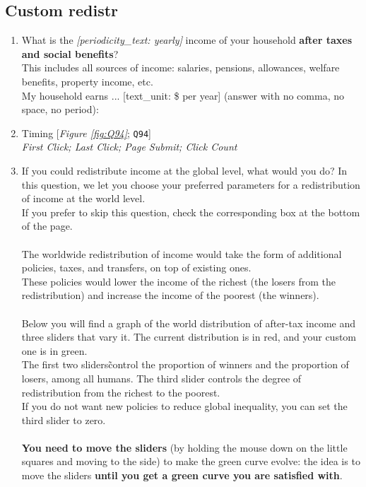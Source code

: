  \subsection*{Custom redistr} 
 \begin{enumerate}[resume] 
\item  \label{q:income_exact} What is the \textit{[periodicity\_text: yearly]} income of your household \textbf{after taxes and social benefits}?\\This includes all sources of income: salaries, pensions, allowances, welfare benefits, property income, etc.\\My household earns ... [text\_unit: \$ per year] (answer with no comma, no space, no period):\\ [\textit{Figure \ref{fig:income_exact}}; 
\verb|income_exact|]


\item  \label{q:Q94} Timing [\textit{Figure \ref{fig:Q94}}; 
\verb|Q94|]
  \\ \textit{First Click; Last Click; Page Submit; Click Count}

\item  \label{q:custom_redistr} If you could redistribute income at the global level, what would you do? In this question, we let you choose your preferred parameters for a redistribution of income at the world level.\~\\If you prefer to skip this question, check the corresponding box at the bottom of the page.\\\\The worldwide redistribution of income would take the form of additional policies, taxes, and transfers, on top of existing ones.\\These policies would lower the income of the richest (the losers from the redistribution) and increase the income of the poorest (the winners).\~\\\\Below you will find a graph of the world distribution of after-tax income and three sliders that vary it. The current distribution is in red, and your custom one is in green.\~\\The first two sliders\~control the proportion of winners and the proportion of losers, among all humans. The third slider controls the degree of redistribution from the richest to the poorest.\~\\If you do not want new policies to reduce global inequality, you can set the third slider to zero.\~\\\\\textbf{You need to move the sliders} (by holding the mouse down on the little squares and moving to the side) to make the green curve evolve: the idea is to move the sliders \textbf{until you get a green curve you are satisfied with}. \\\\


\end{enumerate}
